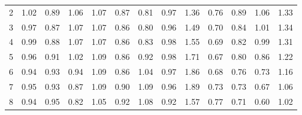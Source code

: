 \documentclass[11pt]{article}
\begin{document}
\begin{appendices}
\begin{table}[htbp]
\begin{tabular}{c|cccc|cccc|cccc}
    2     & 1.02  & 0.89  & 1.06  & 1.07  & 0.87  & 0.81  & 0.97  & 1.36  & 0.76  & 0.89  & 1.06  & 1.33 \\
    3     & 0.97  & 0.87  & 1.07  & 1.07  & 0.86  & 0.80  & 0.96  & 1.49  & 0.70  & 0.84  & 1.01  & 1.34 \\
    4     & 0.99  & 0.88  & 1.07  & 1.07  & 0.86  & 0.83  & 0.98  & 1.55  & 0.69  & 0.82  & 0.99  & 1.31 \\
    5     & 0.96  & 0.91  & 1.02  & 1.09  & 0.86  & 0.92  & 0.98  & 1.71  & 0.67  & 0.80  & 0.86  & 1.22 \\
    6     & 0.94  & 0.93  & 0.94  & 1.09  & 0.86  & 1.04  & 0.97  & 1.86  & 0.68  & 0.76  & 0.73  & 1.16 \\
    7     & 0.95  & 0.93  & 0.87  & 1.09  & 0.90  & 1.09  & 0.96  & 1.89  & 0.73  & 0.73  & 0.67  & 1.06 \\
    8     & 0.94  & 0.95  & 0.82  & 1.05  & 0.92  & 1.08  & 0.92  & 1.57  & 0.77  & 0.71  & 0.60  & 1.02 \\
    \bottomrule
    \end{tabular}%
  \label{condp}%
\end{table}%


\end{appendices}
\end{document}
